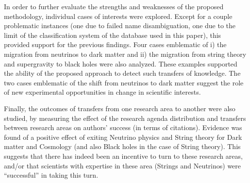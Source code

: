 \documentclass{article}
\begin{document}
In order to further evaluate the strengths and weaknesses of the proposed methodology, individual cases of interests were explored.  Except for a couple problematic instances (one due to failed name disambiguation, one due to the limit of the classification system of the database used in this paper), this provided support for the previous findings. Four cases emblematic of i) the migration from neutrinos to dark matter and ii) the migration from string theory and supergravity to black holes were also analyzed. These examples supported the ability of the proposed approach to detect such transfers of knowledge. The two cases emblematic of the shift from neutrinos to dark matter suggest the role of new experimental opportunities in change in scientific interests.

Finally, the outcomes of transfers from one research area to another were also studied, by measuring the effect of the research agenda distribution and transfers between research areas  on authors' success (in terms of citations). Evidence was found of a positive effect of exiting Neutrino physics and String theory for Dark matter and Cosmology (and also Black holes in the case of String theory). This suggests that there has indeed been an incentive to turn to these research areas, and/or that scientists with expertise in these area (Strings and Neutrinos) were ``successful'' in taking this turn.


\end{document}
